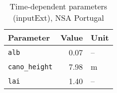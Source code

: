 \begin{table}[ht]
\centering
\caption{Time-dependent parameters (\textsf{inputExt}), NSA Portugal} 
\label{tab:portugalNSA_inputExt}
\begin{tabular}{lrl}
  \hline
Parameter & Value & Unit \\ 
  \hline
\verb!alb! & 0.07 & -- \\ 
  \verb!cano_height! & 7.98 & m \\ 
  \verb!lai! & 1.40 & -- \\ 
   \hline
\end{tabular}
\end{table}
